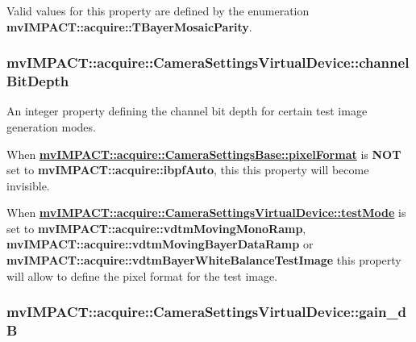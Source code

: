 Valid values for this property are defined by the enumeration {\bfseries mv\+I\+M\+P\+A\+C\+T\+::acquire\+::\+T\+Bayer\+Mosaic\+Parity}. \hypertarget{classmv_i_m_p_a_c_t_1_1acquire_1_1_camera_settings_virtual_device_aa8d2e4f540d6c550d7ef0140260d3d91}{
\subsubsection[{channel\+Bit\+Depth}]{ mv\+I\+M\+P\+A\+C\+T\+::acquire\+::\+Camera\+Settings\+Virtual\+Device\+::channel\+Bit\+Depth}}\label{classmv_i_m_p_a_c_t_1_1acquire_1_1_camera_settings_virtual_device_aa8d2e4f540d6c550d7ef0140260d3d91}


An integer property defining the channel bit depth for certain test image generation modes. 

When {\bfseries \hyperlink{classmv_i_m_p_a_c_t_1_1acquire_1_1_camera_settings_base_af295aa670e45c6cbdb6e5d8517922371}{mv\+I\+M\+P\+A\+C\+T\+::acquire\+::\+Camera\+Settings\+Base\+::pixel\+Format}} is {\bfseries N\+O\+T} set to {\bfseries mv\+I\+M\+P\+A\+C\+T\+::acquire\+::ibpf\+Auto}, this this property will become invisible.

When {\bfseries \hyperlink{classmv_i_m_p_a_c_t_1_1acquire_1_1_camera_settings_virtual_device_a804a5ef868aaf896d39986547d8407f6}{mv\+I\+M\+P\+A\+C\+T\+::acquire\+::\+Camera\+Settings\+Virtual\+Device\+::test\+Mode}} is set to {\bfseries mv\+I\+M\+P\+A\+C\+T\+::acquire\+::vdtm\+Moving\+Mono\+Ramp}, {\bfseries mv\+I\+M\+P\+A\+C\+T\+::acquire\+::vdtm\+Moving\+Bayer\+Data\+Ramp} or {\bfseries mv\+I\+M\+P\+A\+C\+T\+::acquire\+::vdtm\+Bayer\+White\+Balance\+Test\+Image} this property will allow to define the pixel format for the test image. \hypertarget{classmv_i_m_p_a_c_t_1_1acquire_1_1_camera_settings_virtual_device_a4337e2da0e836c79f18b619dc68d8681}{
\subsubsection[{gain\+\_\+d\+B}]{ mv\+I\+M\+P\+A\+C\+T\+::acquire\+::\+Camera\+Settings\+Virtual\+Device\+::gain\+\_\+d\+B}}\label{classmv_i_m_p_a_c_t_1_1acquire_1_1_camera_settings_virtual_device_a4337e2da0e836c79f18b619dc68d8681}



